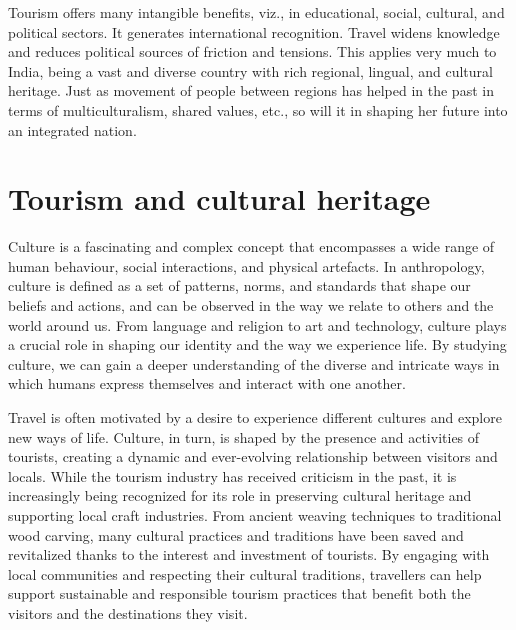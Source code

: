 Tourism offers many intangible benefits, viz., in educational, social, cultural, and political sectors. It generates international recognition. Travel widens knowledge and reduces political sources of friction and tensions. This applies very much to India, being a vast and diverse country with rich regional, lingual, and cultural heritage. Just as movement of people between regions has helped in the past in terms of multiculturalism, shared values, etc., so will it in shaping her future into an integrated nation.


\section{Tourism and cultural heritage} %
\label{sec:tch}

Culture is a fascinating and complex concept that encompasses a wide range of human behaviour, social interactions, and physical artefacts. In anthropology, culture is defined as a set of patterns, norms, and standards that shape our beliefs and actions, and can be observed in the way we relate to others and the world around us. From language and religion to art and technology, culture plays a crucial role in shaping our identity and the way we experience life. By studying culture, we can gain a deeper understanding of the diverse and intricate ways in which humans express themselves and interact with one another.

Travel is often motivated by a desire to experience different cultures and explore new ways of life. Culture, in turn, is shaped by the presence and activities of tourists, creating a dynamic and ever-evolving relationship between visitors and locals. While the tourism industry has received criticism in the past, it is increasingly being recognized for its role in preserving cultural heritage and supporting local craft industries. From ancient weaving techniques to traditional wood carving, many cultural practices and traditions have been saved and revitalized thanks to the interest and investment of tourists. By engaging with local communities and respecting their cultural traditions, travellers can help support sustainable and responsible tourism practices that benefit both the visitors and the destinations they visit.


